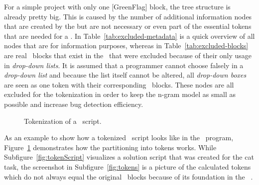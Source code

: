 For a simple \scratch{} project with only one [GreenFlag] block, the tree structure is already pretty big. This is caused by the number of additional information nodes that are created by the \litterbox{} \AST{} but are not necessary or even part of the essential tokens that are needed for a \ngram{}. In Table~\ref{tab:excluded-metadata} is a quick overview of all  nodes that are for information purposes, whereas in Table~\ref{tab:excluded-blocks} are real \scratch\ blocks that exist in the \AST\ that were excluded because of their only usage in \textit{drop-down lists}. It is assumed that a programmer cannot choose falsely in a \textit{drop-down list} and because the list itself cannot be altered, all \textit{drop-down boxes} are seen as one token with their corresponding \scratch\ blocks. These nodes are all excluded for the tokenization in order to keep the n-gram model as small as possible and increase bug detection efficiency.  

\begin{figure}%
    \centering
    \qquad
    \caption[Tokenization of a \scratch\ script]{\label{fig:tokenization}Tokenization of a \scratch\ script.}%
\end{figure}

As an example to show how a tokenized \scratch\ script looks like in the \tokenizer\ program, Figure~\ref{fig:tokenization} demonstrates how the partitioning into tokens works. While Subfigure~\ref{fig:tokenScript} visualizes a solution script that was created for the cat task, the screenshot in Subfigure~\ref{fig:tokens} is a picture of the calculated tokens which do not always equal the original \scratch\ blocks because of its foundation in the \litterbox\ \AST{}. 

